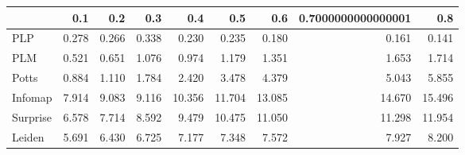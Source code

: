 \begin{tabular}{lrrrrrrrr}
\toprule
{} &   0.1 &   0.2 &   0.3 &    0.4 &    0.5 &    0.6 & 0.7000000000000001 &    0.8 \\
\midrule
PLP      & 0.278 & 0.266 & 0.338 &  0.230 &  0.235 &  0.180 &              0.161 &  0.141 \\
PLM      & 0.521 & 0.651 & 1.076 &  0.974 &  1.179 &  1.351 &              1.653 &  1.714 \\
Potts    & 0.884 & 1.110 & 1.784 &  2.420 &  3.478 &  4.379 &              5.043 &  5.855 \\
Infomap  & 7.914 & 9.083 & 9.116 & 10.356 & 11.704 & 13.085 &             14.670 & 15.496 \\
Surprise & 6.578 & 7.714 & 8.592 &  9.479 & 10.475 & 11.050 &             11.298 & 11.954 \\
Leiden   & 5.691 & 6.430 & 6.725 &  7.177 &  7.348 &  7.572 &              7.927 &  8.200 \\
\bottomrule
\end{tabular}
